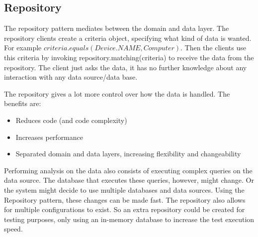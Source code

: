 \subsection{Repository}

The repository pattern mediates between the domain and data layer. The repository clients create a criteria object, specifying what kind of data is wanted. For example $criteria.equals(Device.NAME, Computer)$. Then the clients use this criteria by invoking repository.matching(criteria) to receive the data from the repository. The client just asks the data, it has no further knowledge about any interaction with any data source/data base.

The repository gives a lot more control over how the data is handled. The benefits are:
\begin{itemize}
\item Reduces code (and code complexity)
\item Increases performance
\item Separated domain and data layers, increasing flexibility and changeability
\end{itemize}

Performing analysis on the data also consists of executing complex queries on the data source. The database that executes these queries, however, might change. Or the system might decide to use multiple databases and data sources.
Using the Repository pattern, these changes can be made fast. The repository also allows for multiple configurations to exist. So an extra repository could be created for testing purposes, only using an in-memory database to increase the test execution speed. \\


